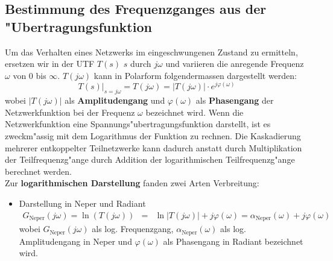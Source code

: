 {\subsection{Bestimmung des Frequenzganges aus der "Ubertra\-gungs\-funk\-tion}
Um das Verhalten eines Netzwerks im eingeschwungenen Zustand zu
ermitteln, ersetzen wir in der UTF $T(s)$ $s$ durch $j\omega$ und
variieren die anregende
Frequenz $\omega$ von $0$ bis $\infty$. {\bf{}}  $T(j\omega)$ kann in
Polarform folgendermassen dargestellt werden:
\begin{equation}
\left. T(s)\right|_{s=j\omega}=T(j\omega)=|T(j\omega)|\cdot e^{j\varphi(\omega)}
\end{equation}
wobei $|T(j\omega)|$ als {\bf Amplitudengang} und
$\varphi(\omega)$ als {\bf Phasengang} der
Netzwerkfunktion bei der Frequenz $\omega$
bezeichnet wird.  Wenn die Netzwerkfunktion eine
Spannungs\-"ubertragungs\-funktion darstellt, ist es zweckm"assig mit dem
Logarithmus der Funktion zu rechnen. Die
Kaskadierung mehrerer entkoppelter Teilnetzwerke
kann dadurch anstatt durch Multiplikation der
Teilfrequenzg"ange durch Addition der
logarithmischen Teilfrequenzg"ange berechnet werden.\\ Zur
{\bf logarithmischen Darstellung} fanden zwei Arten Verbreitung:
\begin{itemize}
\item  Darstellung in Neper und Radiant
       \begin{eqnarray}
       G_{\text{Neper}}(j\omega)=\ln{(T(j\omega))}&=&\ln{|T(j\omega)|}+ j\varphi(\omega)=\alpha_{\text{Neper}}(\omega) + j \varphi(\omega) \nonumber
       \end{eqnarray}
       wobei $G_{\text{Neper}}(j\omega)$ als log. Frequenzgang, $\alpha_{\text{Neper}}(\omega)$ als
       log. Amplitudengang in Neper und $\varphi(\omega)$ als
       Phasengang in Radiant bezeichnet wird.


\end{itemize}}

